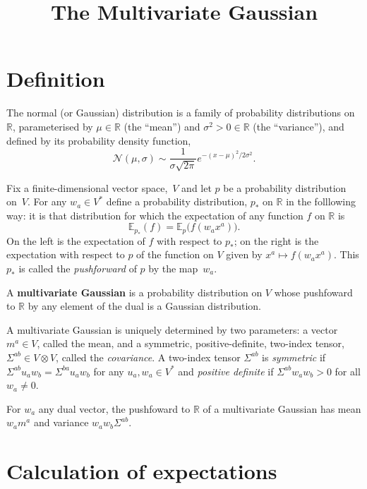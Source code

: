 \documentclass[10pt, a4paper, twocolumn]{article}
\title{The Multivariate Gaussian}
\newcommand{\R}{\mathbb{R}}
\newcommand{\E}{\mathbb{E}}
\newcommand{\N}{\mathcal{N}}
\newcommand{\defn}[1]{\textbf{#1}}
\begin{document}
\maketitle

\section{Definition}

The normal (or Gaussian) distribution is a family of probability distributions
on $\R$, parameterised by $\mu\in\R$ (the “mean”) and $\sigma^2>0 \in\R$ (the “variance”),
and defined by its probability density function,
\begin{equation*}
  \N(\mu, \sigma) \sim \frac{1}{\sigma\sqrt{2\pi}} e^{-(x-\mu)^2/2\sigma^2}.
\end{equation*}

Fix a finite-dimensional vector space,~$V$ and let $p$ be a probability
distribution on~$V$. For any $w_a \in V^*$ define a probability distribution,
$p_*$ on $\R$ in the folllowing way: it is that distribution for which the
expectation of any function $f$ on $\R$ is
\begin{equation*}
\E_{p_*}(f) = \E_p\bigl(f(w_a x^a)\bigr). 
\end{equation*}
On the left is the expectation of $f$ with respect to $p_*$; on the right is the
expectation with respect to $p$ of the function on $V$ given by $x^ a\mapsto f(w_a
x^a)$. This $p_*$ is called the \emph{pushforward} of $p$ by the map~$w_a$.

A \defn{multivariate Gaussian} is a probability distribution on $V$ whose
pushfoward to $\R$ by any element of the dual is a Gaussian distribution.

A multivariate Gaussian is uniquely determined by two parameters: a vector $m^a\in
V$, called the mean, and a symmetric, positive-definite, two-index tensor,
$\Sigma^{ab}\in V\otimes V$, called the \emph{covariance}. A two-index tensor $\Sigma^{ab}$ is
\emph{symmetric} if $\Sigma^{ab}u_a w_b = \Sigma^{ba} u_a w_b$ for any $u_a, w_a \in V^*$ and
\emph{positive definite} if $\Sigma^{ab}w_a w_b > 0$ for all $w_a\neq 0$.

For $w_a$ any dual vector, the pushfoward to $\R$ of a multivariate Gaussian has
mean $w_a m^a$ and variance $w_a w_b \Sigma^{ab}$.


\section{Calculation of expectations}
\end{document}
